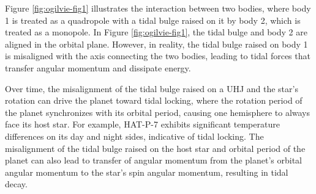 \documentclass[oneside,12pt]{amsart}
\numberwithin{page}{section}
\begin{document}

Figure \ref{fig:ogilvie-fig1} illustrates the interaction between two bodies, where body 1 is treated as a quadropole with a tidal bulge raised on it by body 2, which is treated as a monopole. In Figure \ref{fig:ogilvie-fig1}, the tidal bulge and body 2 are aligned in the orbital plane. However, in reality, the tidal bulge raised on body 1 is misaligned with the axis connecting the two bodies, leading to tidal forces that transfer angular momentum and dissipate energy. 

Over time, the misalignment of the tidal bulge raised on a UHJ and the star's rotation can drive the planet toward tidal locking, where the rotation period of the planet synchronizes with its orbital period, causing one hemisphere to always face its host star. For example, HAT-P-7 \citep{helling2019understanding} exhibits significant temperature differences on its day and night sides, indicative of tidal locking. The misalignment of the tidal bulge raised on the host star and orbital period of the planet can also lead to transfer of angular momentum from the planet's orbital angular momentum to the star's spin angular momentum, resulting in tidal decay.

\end{document}
